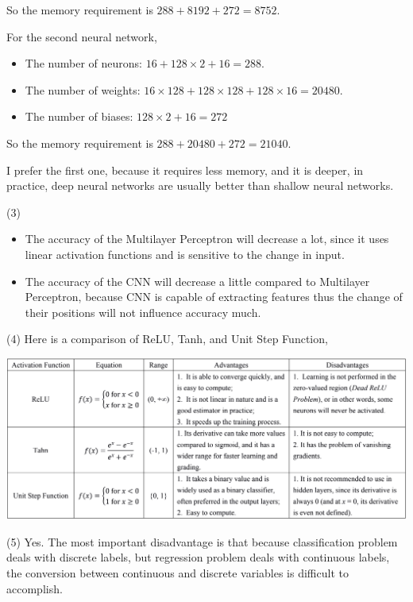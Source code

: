 \documentclass[11pt]{article}
\begin{document}
\begin{solution}
\begin{itemize}
\end{itemize}
So the memory requirement is $288 + 8192 + 272 = 8752$.
\pagebreak
\item For the second neural network,
\begin{itemize}
\item The number of neurons: $16 + 128 \times 2 + 16 = 288$.
\item The number of weights: $16 \times 128 + 128 \times 128 + 128 \times 16 = 20480$.
\item The number of biases: $128 \times 2 + 16 = 272$
\end{itemize}
So the memory requirement is $288 + 20480 + 272 = 21040$.
\item I prefer the first one, because it requires less memory, and it is deeper, in practice, deep neural networks are usually better than shallow neural networks.
\item (3) 
\begin{itemize}
\item The accuracy of the Multilayer Perceptron will decrease a lot, since it uses linear activation functions and is sensitive to the change in input.
\item The accuracy of the CNN will decrease a little compared to Multilayer Perceptron, because CNN is capable of extracting features thus the change of their positions will not influence accuracy much.
\end{itemize}
\item (4) Here is a comparison of ReLU, Tanh, and Unit Step Function,
\begin{center}
\includegraphics[width=15.5cm]{5.png}
\end{center}
\item (5) Yes. The most important disadvantage is that because classification problem deals with discrete labels, but regression problem deals with continuous labels, the conversion between continuous and discrete variables is difficult to accomplish.
\end{solution}
\end{document}
